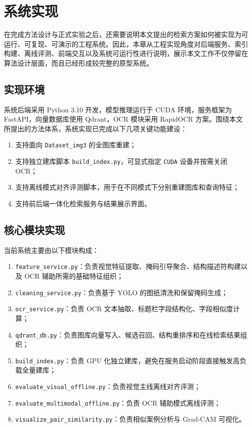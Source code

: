 \chapter{系统实现}

在完成方法设计与正式实验之后，还需要说明本文提出的检索方案如何被实现为可运行、可复现、可演示的工程系统。因此，本章从工程实现角度对后端服务、索引构建、离线评测、前端交互以及系统可运行性进行说明，展示本文工作不仅停留在算法设计层面，而且已经形成较完整的原型系统。

\section{实现环境}

系统后端采用 Python 3.10 开发，模型推理运行于 CUDA 环境，服务框架为 FastAPI，向量数据库使用 Qdrant，OCR 模块采用 RapidOCR 方案。围绕本文所提出的方法体系，系统实现已完成以下几项关键功能建设：
\begin{enumerate}
  \item 支持面向 \texttt{Dataset\_img3} 的全图库重建；
  \item 支持独立建库脚本 \texttt{build\_index.py}，可显式指定 \texttt{CUDA} 设备并按需关闭 OCR；
  \item 支持离线模式对齐评测脚本，用于在不同模式下分别重建图库和查询特征；
  \item 支持前后端一体化检索服务与结果展示界面。
\end{enumerate}

\section{核心模块实现}

当前系统主要由以下模块构成：
\begin{enumerate}
  \item \texttt{feature\_service.py}：负责视觉特征提取、掩码引导聚合、结构描述符构建以及 OCR 辅助所需的基础特征组织；
  \item \texttt{cleaning\_service.py}：负责基于 YOLO 的图纸清洗和保留掩码生成；
  \item \texttt{ocr\_service.py}：负责 OCR 文本抽取、标题栏字段结构化、字段相似度计算；
  \item \texttt{qdrant\_db.py}：负责图库向量写入、候选召回、结构重排序和在线检索结果组织；
  \item \texttt{build\_index.py}：负责 GPU 化独立建库，避免在服务启动阶段直接触发高负载全量建库；
  \item \texttt{evaluate\_visual\_offline.py}：负责视觉主线离线对齐评测；
  \item \texttt{evaluate\_multimodal\_offline.py}：负责 OCR 辅助模式离线评测；
  \item \texttt{visualize\_pair\_similarity.py}：负责相似案例分析与 Grad-CAM 可视化。
\end{enumerate}

